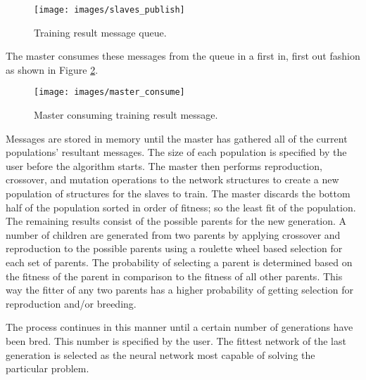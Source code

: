 \begin{figure}[htb!]
  \centering
  \texttt{[image: images/slaves\_publish]}
  \caption{Training result message queue.}
  \label{slaves_publish}
\end{figure}

\newpage
The master consumes these messages from the queue in a first in, first out fashion as shown in Figure \ref{master_consume}.

\begin{figure}[htb!]
  \centering
  \texttt{[image: images/master\_consume]}
  \caption{Master consuming training result message.}
  \label{master_consume}
\end{figure}

Messages are stored in memory until the master has gathered all of the current populations' resultant messages. 
The size of each population is specified by the user before the algorithm starts.
The master then performs reproduction, crossover, and mutation operations to the network structures to create a new population of structures for the slaves to train.
The master discards the bottom half of the population sorted in order of fitness; so the least fit of the population. 
The remaining results consist of the possible parents for the new generation. 
A number of children are generated from two parents by applying crossover and reproduction to the possible parents using a roulette wheel based selection for each set of parents. 
The probability of selecting a parent is determined based on the fitness of the parent in comparison to the fitness of all other parents. 
This way the fitter of any two parents has a higher probability of getting selection for reproduction and/or breeding.

The process continues in this manner until a certain number of generations have been bred. 
This number is specified by the user. 
The fittest network of the last generation is selected as the neural
network most capable of solving the particular problem.
